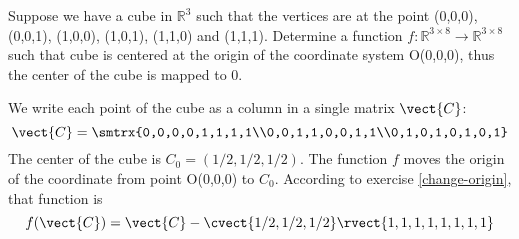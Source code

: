 \begin{exercise}
Suppose we have a cube in $\mathbb{R}^3$ such that the vertices are at the point (0,0,0), (0,0,1), (1,0,0), (1,0,1), (1,1,0) and (1,1,1). Determine a function $f:\mathbb{R}^{3\times8}\rightarrow\mathbb{R}^{3\times8}$ such that cube is centered at the origin of the coordinate system O(0,0,0), thus the center of the cube is mapped to 0.
\end{exercise}

\begin{solution}
We write each point of the cube as a column in a single matrix $\vect{C}$:
\[ \vect{C}=\smtrx{0,0,0,0,1,1,1,1\\0,0,1,1,0,0,1,1\\0,1,0,1,0,1,0,1} \]
The center of the cube is $C_0=(1/2,1/2,1/2)$. The function $f$ moves the origin of the coordinate from point O(0,0,0) to $C_0$. According to exercise \ref{change-origin}, that function is 
\[ f(\vect{C})=\vect{C} - \cvect{1/2,1/2,1/2}\rvect{1,1,1,1,1,1,1,1} \]
\end{solution}
